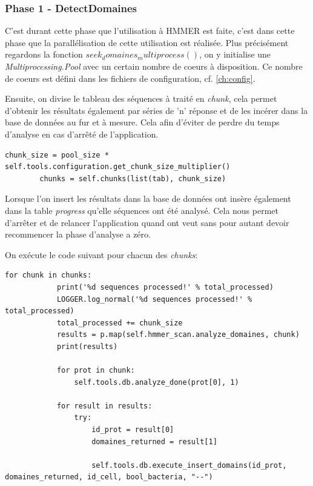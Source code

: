 \subsubsection{Phase 1 - DetectDomaines}

C'est durant cette phase que l'utilisation à HMMER est faite, c'est dans cette phase que la parallélisation de cette utilisation est réalisée. Plus précisément regardons la fonction \emph{$seek_domaines_multiprocess()$}, on y initialise une \emph{Multiprocessing.Pool} avec un certain nombre de coeurs à disposition. Ce nombre de coeurs est défini dans les fichiers de configuration, cf. \ref{ch:config}.

Ensuite, on divise le tableau des séquences à traité en \emph{chunk}, cela permet d'obtenir les résultats également par séries de 'n' réponse et de les incérer dans la base de données au fur et à mesure. Cela afin d'éviter de perdre du temps d'analyse en cas d'arrêté de l'application.

\lstset{language=python}
\begin{lstlisting}[frame=single]
chunk_size = pool_size * self.tools.configuration.get_chunk_size_multiplier()
        chunks = self.chunks(list(tab), chunk_size)
\end{lstlisting} 

Lorsque l'on insert les résultats dans la base de données ont insère également dans la table \emph{progress} qu'elle séquences ont été analysé. Cela nous permet d'arrêter et de relancer l'application quand ont veut sans pour autant devoir recommencer la phase d'analyse a zéro.

On exécute le code suivant pour chacun des \emph{chunks}:
\begin{lstlisting}[frame=single]
for chunk in chunks:
            print('%d sequences processed!' % total_processed)
            LOGGER.log_normal('%d sequences processed!' % total_processed)
            total_processed += chunk_size
            results = p.map(self.hmmer_scan.analyze_domaines, chunk)
            print(results)

            for prot in chunk:
                self.tools.db.analyze_done(prot[0], 1)

            for result in results:
                try:
                    id_prot = result[0]
                    domaines_returned = result[1]

                    self.tools.db.execute_insert_domains(id_prot, domaines_returned, id_cell, bool_bacteria, "--")
\end{lstlisting} 

